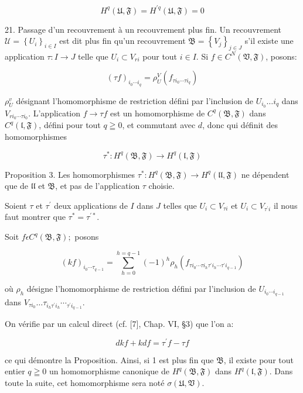 $$
H^{q}(\mathfrak{U}, \mathfrak{F})=H^{\prime q}(\mathfrak{U}, \mathfrak{F})=0
$$

21. Passage d'un recouvrement à un recouvrement plus fin. Un recouvrement $\mathcal{U}=\left\{U_{i}\right\}_{i \in I}$ est dit plus fin qu'un recouvrement $\mathfrak{B}=\left\{V_{j}\right\}_{j \in J}$ s'il existe une application $\tau: I \rightarrow J$ telle que $U_{i} \subset V_{r i}$ pour tout $i \in I .$ Si $f \in C^{N}(\mathfrak{V}, \mathfrak{F})$, posons:

$$
(\tau f)_{i_{0} \cdots i_{q}}=\rho_{U}^{V}\left(f_{\tau i_{0} \cdots \tau i_{q}}\right)
$$

$\rho_{U}^{v}$ désignant l'homomorphisme de restriction défini par l'inclusion de $U_{i_{0}} \ldots i_{q}$ dans $V_{r i_{0} \cdots \tau i_{0}} .$ L'application $f \rightarrow \tau f$ est un homomorphisme de $C^{q}(\mathfrak{B}, \mathfrak{F})$ dans $C^{q}(\mathfrak{l}, \mathfrak{F})$, défini pour tout $q \geqq 0$, et commutant avec $d$, donc qui définit des homomorphismes

$$
\tau^{*}: H^{q}(\mathfrak{B}, \mathfrak{F}) \rightarrow H^{q}(\mathfrak{l}, \mathfrak{F})
$$

Proposition 3. Les homomorphismes $\tau^{*}: H^{q}(\mathfrak{B}, \mathfrak{F}) \rightarrow H^{q}(\mathfrak{l l}, \mathfrak{F})$ ne dépendent que de $\mathfrak{l l}$ et $\mathfrak{B}$, et pas de l'application $\tau$ choisie.

Soient $\tau$ et $\tau^{\prime}$ deux applications de $I$ dans $J$ telles que $U_{i} \subset V_{\tau i}$ et $U_{i} \subset V_{\tau^{\prime} i}$ il nous faut montrer que $\tau^{*}=\tau^{\prime *}$.

Soit $f \epsilon C^{q}(\mathfrak{B}, \mathfrak{F}) ;$ posons

$$
(k f)_{i_{0} \cdots \tau_{q-1}}=\sum_{h=0}^{h=q-1}(-1)^{h} \rho_{h}\left(f_{\tau i_{0} \cdots \tau i_{h} \tau^{\prime} i_{h} \cdots \tau^{\prime} i_{q-1}}\right)
$$

où $\rho_{h}$ désigne l'homomorphisme de restriction défini par l'inclusion de $U_{i_{0} \cdots i_{q-1}}$ dans $V_{\tau i_{0}} \ldots \tau_{i_{h} \tau^{\prime} i_{h}} \cdots_{\tau^{\prime} i_{q-1}}$.

On vérifie par un calcul direct (cf. [7], Chap. VI, §3) que l'on a:

$$
d k f+k d f=\tau^{\prime} f-\tau f
$$

ce qui démontre la Proposition. Ainsi, si 1 est plus fin que $\mathfrak{B}$, il existe pour tout entier $q \geqq 0$ un homomorphisme canonique de $H^{q}(\mathfrak{B}, \mathfrak{F})$ dans $H^{q}(\mathfrak{l}, \mathfrak{F}) .$ Dans toute la suite, cet homomorphisme sera noté $\sigma(\mathfrak{U}, \mathfrak{V})$.

